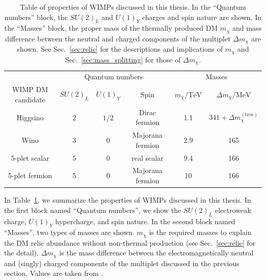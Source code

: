 \documentclass[12pt,twoside,book]{article}
\begin{document}
\begin{table}
  \centering
  \begin{tabular}{c|ccc|cc}
    & \multicolumn{3}{c|}{Quantum numbers} & \multicolumn{2}{c}{Masses}\\
    WIMP DM candidate & $SU(2)_L$ & $U(1)_Y$ & Spin & $m_\chi / \mathrm{TeV}$ &
    $\Delta m_\chi / \mathrm{MeV}$ \\
    \hline
    Higgsino & $2$ & $1/2$ & Dirac fermion & 1.1 & $341 + \Delta m_\chi^{\mathrm{(tree)}}$ \\
    Wino & $3$ & $0$ & Majorana fermion & 2.9 & 165 \\
    5-plet scalar & $5$ & $0$ & real scalar & 9.4 & 166 \\
    5-plet fermion & $5$ & $0$ & Majorana fermion & 10 & 166
  \end{tabular}
  \caption{
    Table of properties of WIMPs discussed in this thesis.
    In the ``Quantum numbers'' block, the $SU(2)_L$ and $U(1)_Y$ charges and spin nature are shown.
    In the ``Masses'' block, the proper mass of the thermally produced DM $m_\chi$ and mass difference between the neutral and charged components of the multiplet $\Delta m_\chi$ are shown.
    See Sec.~\ref{sec:relic} for the descriptions and implications of $m_\chi$ and Sec.~\ref{sec:mass_splitting} for those of $\Delta m_\chi$.
  }
  \label{tab:WIMP_property}
\end{table}

In Table~\ref{tab:WIMP_property}, we summarize the properties of WIMPs discussed in this thesis.
In the first block named ``Quantum numbers'', we show the $SU(2)_L$ electroweak charge, $U(1)_Y$ hypercharge, and spin nature.
In the second block named ``Masses'', two types of masses are shown.
$m_\chi$ is the required masses to explain the DM relic abundance without non-thermal production (see Sec.~\ref{sec:relic} for the detail).
$\Delta m_\chi$ is the mass difference between the electromagnetically neutral and (singly) charged components of the multiplet discussed in the previous section.
Values are taken from \cite{Farina:2013mla, ArkaniHamed:2006mb, Hisano:2006nn,  Cirelli:2007xd, Moroi:2013sla, Beneke:2016ync}.

% 
% 
\end{document}
